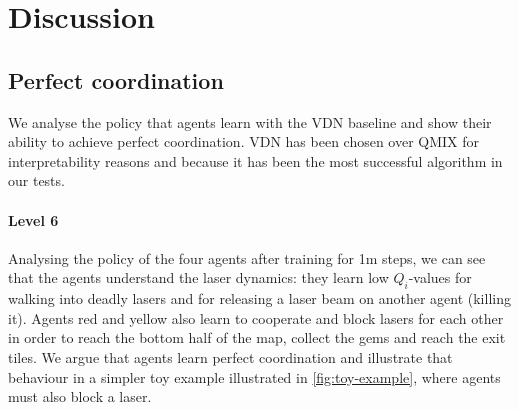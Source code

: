 \section{Discussion}
\label{sec:discussion}

\subsection{Perfect coordination}
\label{sec:perfect-coordination}
We analyse the policy that agents learn with the VDN baseline and show their ability to achieve perfect coordination. VDN has been chosen over QMIX for interpretability reasons and because it has been the most successful algorithm in our tests. 

\paragraph{Level 6} Analysing the policy of the four agents after training for 1m steps, we can see that the agents understand the laser dynamics: they learn low $Q_i$-values for walking into deadly lasers and for releasing a laser beam on another agent (killing it). Agents red and yellow also learn to cooperate and block lasers for each other in order to reach the bottom half of the map, collect the gems and reach the exit tiles. We argue that agents learn perfect coordination and illustrate that behaviour in a simpler toy example illustrated in \autoref{fig:toy-example}, where agents must also block a laser.


